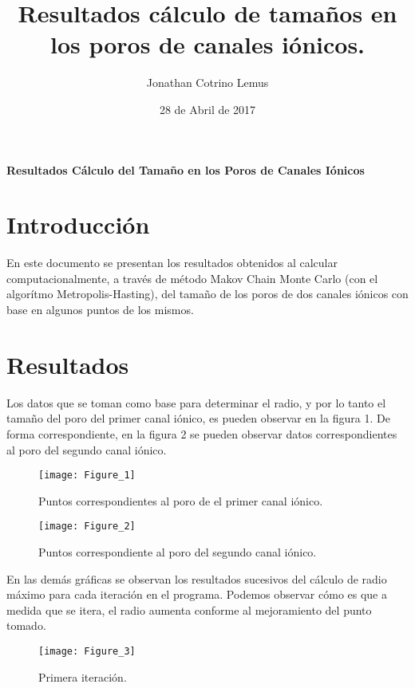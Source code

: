 \documentclass{article}
\title{Resultados c\'alculo de tamaños en los poros de canales i\'onicos.}
\author{Jonathan Cotrino Lemus}
\date{28 de Abril de 2017}
\begin{document}
\begin{center}
\textbf{\large{Resultados C\'alculo del Tamaño en los Poros de Canales I\'onicos}}
\end{center}

\section{Introducci\'on}

En este documento se presentan los resultados obtenidos al calcular computacionalmente, a trav\'es de m\'etodo Makov Chain Monte Carlo (con el algor\'itmo Metropolis-Hasting), del tamaño de los poros de dos canales i\'onicos con base en algunos puntos de los mismos.

\section{Resultados}

Los datos que se toman como base para determinar el radio, y por lo tanto el tamaño del  poro del primer canal i\'onico, es pueden observar en la figura 1. De forma correspondiente, en  la figura 2 se pueden observar datos correspondientes al poro del segundo canal i\'onico.

\begin{figure}
\begin{center}
\texttt{[image: Figure\_1]}
\end{center}
\caption{Puntos correspondientes al poro de el primer canal i\'onico.}
\end{figure}
\begin{figure}


\begin{center}
\texttt{[image: Figure\_2]}
\end{center}
\caption{Puntos correspondiente al poro del segundo canal i\'onico.}
\end{figure}

En las dem\'as gr\'aficas se observan los resultados sucesivos del c\'alculo de radio m\'aximo para cada iteraci\'on en el programa. Podemos observar c\'omo es que a medida que se itera, el radio aumenta conforme al mejoramiento del punto tomado. 

\begin{figure}
\begin{center}
\texttt{[image: Figure\_3]}
\end{center}
\caption{Primera iteraci\'on.}
\end{figure}
\end{document}
